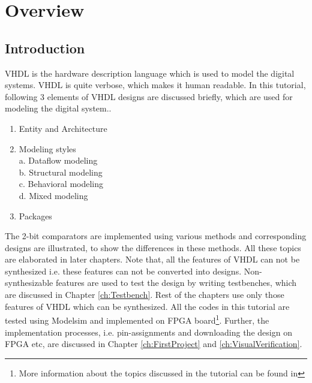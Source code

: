 \chapter{Overview} \label{ch:OverView}


\graphicspath{{Chapters/Overview/Figures/}}


%
%
%

\section{Introduction}
VHDL is the hardware description language which is used to model the digital systems. VHDL is quite verbose, which makes it human readable. In this tutorial, following 3 elements of VHDL designs are discussed briefly, which are used for modeling the digital system.. 
\begin{enumerate}
	\item Entity and Architecture
	\item Modeling styles\\
	a. Dataflow modeling\\
	b. Structural modeling\\
	c. Behavioral modeling\\
	d. Mixed modeling
	\item Packages
\end{enumerate}

The 2-bit comparators are implemented using various methods and corresponding designs are illustrated, to show the differences in these methods. All these topics are elaborated in later chapters. Note that, all the features of VHDL can not be synthesized i.e. these features can not be converted into designs. Non-synthesizable features are used to test the design by writing testbenches, which are discussed in Chapter \ref{ch:Testbench}. Rest of the chapters use only those features of VHDL which can be synthesized. All the codes in this tutorial are tested using Modelsim and implemented on FPGA board\footnote{More information about the topics discussed in the tutorial can be found in }. Further, the implementation processes, i.e. pin-assignments and downloading the design on FPGA etc, are discussed in Chapter \ref{ch:FirstProject} and \ref{ch:VisualVerification}.


